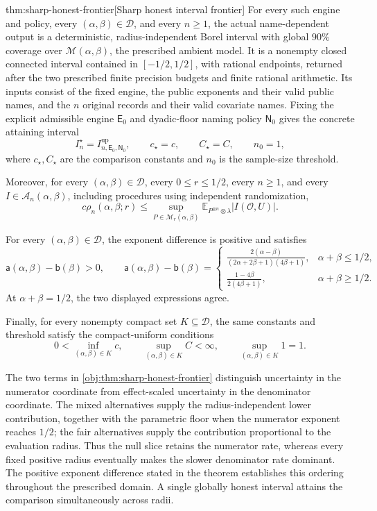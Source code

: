 \begin{theoremv}{thm:sharp-honest-frontier}[Sharp honest interval frontier]
For every such engine and policy, every \((\alpha,\beta)\in\mathcal D\), and every \(n\ge1\), the actual name-dependent output is a deterministic, radius-independent Borel interval with global \(90\%\) coverage over \(\mathcal M(\alpha,\beta)\), the prescribed ambient model. It is a nonempty closed connected interval contained in \([-1/2,1/2]\), with rational endpoints, returned after the two prescribed finite precision budgets and finite rational arithmetic. Its inputs consist of the fixed engine, the public exponents and their valid public names, and the \(n\) original records and their valid covariate names. Fixing the explicit admissible engine \(\mathsf E_0\) and dyadic-floor naming policy \(\mathsf N_0\) gives the concrete attaining interval
\[
I_n^\star
=I^{\mathrm{up}}_{n,\mathsf E_0,\mathsf N_0},
\qquad
c_\star=c,\qquad C_\star=C,\qquad n_0=1,
\]
where \(c_\star,C_\star\) are the comparison constants and \(n_0\) is the sample-size threshold.

Moreover, for every \((\alpha,\beta)\in\mathcal D\), every \(0\le r\le1/2\), every \(n\ge1\), and every \(I\in\mathcal A_n(\alpha,\beta)\), including procedures using independent randomization,
\[
c\rho_n(\alpha,\beta;r)
\le
\sup_{P\in\mathcal M_r(\alpha,\beta)}
\mathbb E_{P^{\otimes n}\otimes\lambda}
\bigl|I(\mathcal O,U)\bigr|.
\]

For every \((\alpha,\beta)\in\mathcal D\), the exponent difference is positive and satisfies
\[
\mathsf a(\alpha,\beta)-\mathsf b(\beta)>0,
\qquad
\mathsf a(\alpha,\beta)-\mathsf b(\beta)
=
\begin{cases}
\displaystyle
\frac{2(\alpha-\beta)}
{(2\alpha+2\beta+1)(4\beta+1)},
&\alpha+\beta\le1/2,\\[6pt]
\displaystyle
\frac{1-4\beta}{2(4\beta+1)},
&\alpha+\beta\ge1/2.
\end{cases}
\]
At \(\alpha+\beta=1/2\), the two displayed expressions agree.

Finally, for every nonempty compact set \(K\subseteq\mathcal D\), the same constants and threshold satisfy the compact-uniform conditions
\[
0<\inf_{(\alpha,\beta)\in K}c,
\qquad
\sup_{(\alpha,\beta)\in K}C<\infty,
\qquad
\sup_{(\alpha,\beta)\in K}1=1.
\]
\end{theoremv}

The two terms in \cref{obj:thm:sharp-honest-frontier} distinguish uncertainty in the numerator coordinate from effect-scaled uncertainty in the denominator coordinate. The mixed alternatives supply the radius-independent lower contribution, together with the parametric floor when the numerator exponent reaches \(1/2\); the fair alternatives supply the contribution proportional to the evaluation radius. Thus the null slice retains the numerator rate, whereas every fixed positive radius eventually makes the slower denominator rate dominant. The positive exponent difference stated in the theorem establishes this ordering throughout the prescribed domain. A single globally honest interval attains the comparison simultaneously across radii.

